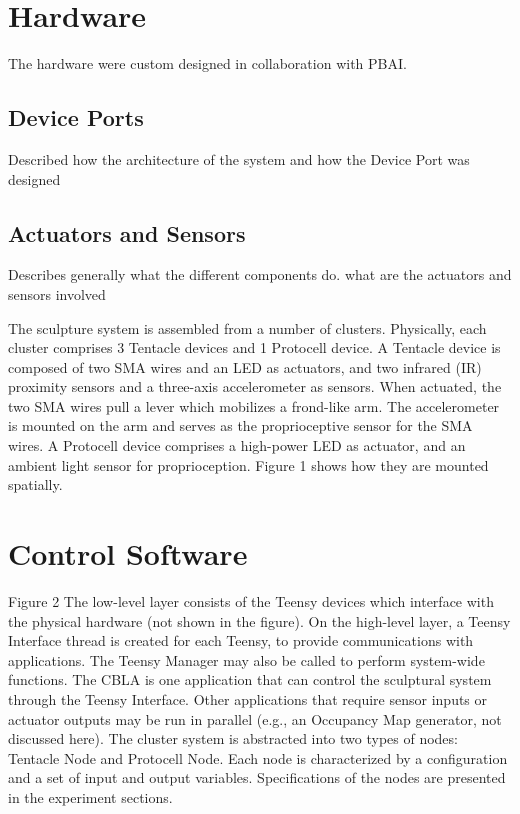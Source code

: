 \section{Hardware} \label{section:hardware}

The hardware were custom designed in collaboration with PBAI. 

\subsection{Device Ports}
Described how the architecture of the system and how the Device Port was designed

\subsection{Actuators and Sensors}
Describes generally what the different components do. what are the actuators and sensors involved



The sculpture system is assembled from a number of clusters. Physically, each cluster comprises 3 Tentacle devices and 1 Protocell device. A Tentacle device is composed of two SMA wires and an LED as actuators, and two infrared (IR) proximity sensors and a three-axis accelerometer as sensors. When actuated, the two SMA wires pull a lever which mobilizes a frond-like arm. The accelerometer is mounted on the arm and serves as the proprioceptive sensor for the SMA wires. A Protocell device comprises a high-power LED as actuator, and an ambient light sensor for proprioception. Figure 1 shows how they are mounted spatially.


\section{Control Software}

Figure 2	 The low-level layer consists of the Teensy devices which interface with the physical hardware (not shown in the figure). On the high-level layer, a Teensy Interface thread is created for each Teensy, to provide communications with applications. The Teensy Manager may also be called to perform system-wide functions. The CBLA is one application that can control the sculptural system through the Teensy Interface. Other applications that require sensor inputs or actuator outputs may be run in parallel (e.g., an Occupancy Map generator, not discussed here).
The cluster system is abstracted into two types of nodes: Tentacle Node and Protocell Node. Each node is characterized by a configuration and a set of input and output variables. Specifications of the nodes are presented in the experiment sections.

